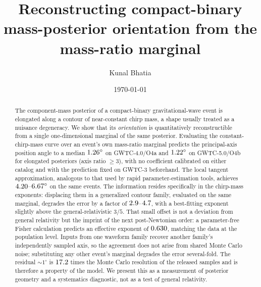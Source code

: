 \documentclass[aps,preprint,amsmath,amssymb,nofootinbib,superscriptaddress]{revtex4-2}
\begin{document}
\title{Reconstructing compact-binary mass-posterior orientation from the mass-ratio marginal}
\author{Kunal Bhatia}
\date{\today}

\begin{abstract}
The component-mass posterior of a compact-binary gravitational-wave event is elongated along a contour of
near-constant chirp mass, a shape usually treated as a nuisance degeneracy. We show that its
\emph{orientation} is quantitatively reconstructible from a single one-dimensional marginal of the same
posterior. Evaluating the constant-chirp-mass curve over an event's own mass-ratio marginal predicts the
principal-axis position angle to a median $1.26^\circ$ on GWTC-4.0/O4a and
$1.22^\circ$ on GWTC-5.0/O4b for elongated posteriors (axis ratio $\ge 3$), with no
coefficient calibrated on either catalog and with the prediction fixed on GWTC-3 beforehand. The local
tangent approximation, analogous to that used by rapid parameter-estimation tools, achieves
$4.20$--$6.67^\circ$ on the same events. The information resides specifically in
the chirp-mass exponents: displacing them in a generalized contour family, evaluated on the same
marginal, degrades the error by a factor of $2.9$--$4.7$, with a best-fitting exponent
slightly above the general-relativistic $3/5$. That small offset is not a deviation from general
relativity but the imprint of the next post-Newtonian order: a parameter-free Fisher calculation predicts
an effective exponent of $0.630$, matching the data at the population level. Inputs from one
waveform family recover another family's independently sampled axis, so the agreement does not arise from
shared Monte Carlo noise; substituting any other event's marginal degrades the error several-fold. The residual
$\sim\!1^\circ$ is $17.2$ times the Monte Carlo resolution of the released samples and is therefore
a property of the model. We present this as a measurement of posterior geometry and a systematics
diagnostic, not as a test of general relativity.
\end{abstract}
\maketitle
\end{document}

